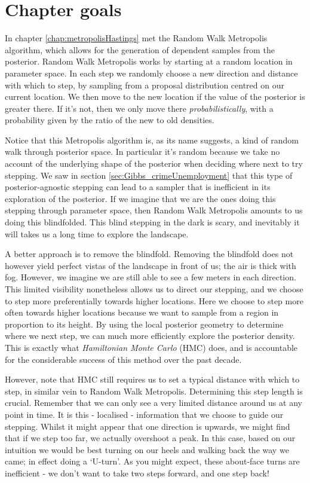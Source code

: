 \documentclass[11pt,fullpage]{book}
\begin{document}
\section{Chapter goals}
In chapter \ref{chap:metropolisHastings} met the Random Walk Metropolis algorithm, which allows for the generation of dependent samples from the posterior. Random Walk Metropolis works by starting at a random location in parameter space. In each step we randomly choose a new direction and distance with which to step, by sampling from a proposal distribution centred on our current location. We then move to the new location if the value of the posterior is greater there. If it's not, then we only move there \textit{probabilistically}, with a probability given by the ratio of the new to old densities.

Notice that this Metropolis algorithm is, as its name suggests, a kind of random walk through posterior space. In particular it's random because we take no account of the underlying shape of the posterior when deciding where next to try stepping. We saw in section \ref{sec:Gibbs_crimeUnemployment} that this type of posterior-agnostic stepping can lead to a sampler that is inefficient in its exploration of the posterior. If we imagine that we are the ones doing this stepping through parameter space, then Random Walk Metropolis amounts to us doing this blindfolded. This blind stepping in the dark is scary, and inevitably it will takes us a long time to explore the landscape.	

A better approach is to remove the blindfold. Removing the blindfold does not however yield perfect vistas of the landscape in front of us; the air is thick with fog. However, we imagine we are still able to see a few meters in each direction. This limited visibility nonetheless allows us to direct our stepping, and we choose to step more preferentially towards higher locations. Here we choose to step more often towards higher locations because we want to sample from a region in proportion to its height. By using the local posterior geometry to determine where we next step, we can much more efficiently explore the posterior density. This is exactly what \textit{Hamiltonian Monte Carlo} (HMC) does, and is accountable for the considerable success of this method over the past decade. 

However, note that HMC still requires us to set a typical distance with which to step, in similar vein to Random Walk Metropolis. Determining this step length is crucial. Remember that we can only see a very limited distance around us at any point in time. It is this - localised - information that we choose to guide our stepping. Whilst it might appear that one direction is upwards, we might find that if we step too far, we actually overshoot a peak. In this case, based on our intuition we would be best turning on our heels and walking back the way we came; in effect doing a `U-turn'. As you might expect, these about-face turns are inefficient - we don't want to take two steps forward, and one step back! 
\end{document}
